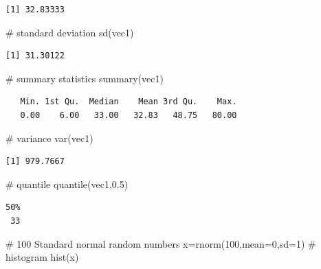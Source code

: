 \documentclass[
  letterpaper,
  DIV=11,
  numbers=noendperiod]{scrreprt}
\newenvironment{Shaded}{\begin{snugshade}}{\end{snugshade}}
\newcommand{\AttributeTok}[1]{\textcolor[rgb]{0.40,0.45,0.13}{#1}}
\newcommand{\CommentTok}[1]{\textcolor[rgb]{0.37,0.37,0.37}{#1}}
\newcommand{\DecValTok}[1]{\textcolor[rgb]{0.68,0.00,0.00}{#1}}
\newcommand{\FloatTok}[1]{\textcolor[rgb]{0.68,0.00,0.00}{#1}}
\newcommand{\FunctionTok}[1]{\textcolor[rgb]{0.28,0.35,0.67}{#1}}
\newcommand{\NormalTok}[1]{\textcolor[rgb]{0.00,0.23,0.31}{#1}}
\newcommand{\OtherTok}[1]{\textcolor[rgb]{0.00,0.23,0.31}{#1}}
\begin{document}
\begin{verbatim}
[1] 32.83333
\end{verbatim}

\begin{Shaded}
\begin{Highlighting}[]
\CommentTok{\# standard deviation}
\FunctionTok{sd}\NormalTok{(vec1)}
\end{Highlighting}
\end{Shaded}

\begin{verbatim}
[1] 31.30122
\end{verbatim}

\begin{Shaded}
\begin{Highlighting}[]
\CommentTok{\# summary statistics}
\FunctionTok{summary}\NormalTok{(vec1)}
\end{Highlighting}
\end{Shaded}

\begin{verbatim}
   Min. 1st Qu.  Median    Mean 3rd Qu.    Max. 
   0.00    6.00   33.00   32.83   48.75   80.00 
\end{verbatim}

\begin{Shaded}
\begin{Highlighting}[]
\CommentTok{\# variance}
\FunctionTok{var}\NormalTok{(vec1)}
\end{Highlighting}
\end{Shaded}

\begin{verbatim}
[1] 979.7667
\end{verbatim}

\begin{Shaded}
\begin{Highlighting}[]
\CommentTok{\# quantile}
\FunctionTok{quantile}\NormalTok{(vec1,}\FloatTok{0.5}\NormalTok{)}
\end{Highlighting}
\end{Shaded}

\begin{verbatim}
50% 
 33 
\end{verbatim}

\begin{Shaded}
\begin{Highlighting}[]
\CommentTok{\# 100 Standard normal random numbers}
\NormalTok{x}\OtherTok{=}\FunctionTok{rnorm}\NormalTok{(}\DecValTok{100}\NormalTok{,}\AttributeTok{mean=}\DecValTok{0}\NormalTok{,}\AttributeTok{sd=}\DecValTok{1}\NormalTok{)}
\CommentTok{\# histogram}
\FunctionTok{hist}\NormalTok{(x)}
\end{Highlighting}
\end{Shaded}
\end{document}
